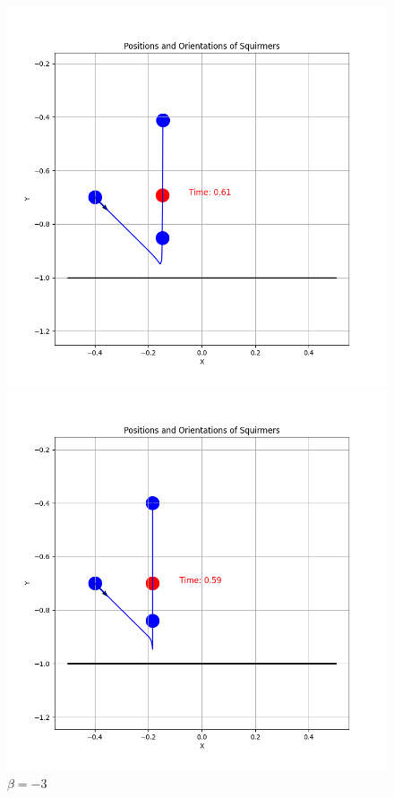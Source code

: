 \documentclass{article}
\begin{document}
\begin{figure}[H]
\begin{minipage}{0.49\textwidth}
        \caption{\footnotesize $\beta = 3$}
    \end{minipage}
    \begin{minipage}{0.49\textwidth}
        \includegraphics[width=1.1\textwidth]{graphs/simulations/border/betam1_5/mpi_4.png}
        \caption{\footnotesize $\beta = -1.5$}
    \end{minipage}\hfill
    \begin{minipage}{0.49\textwidth}
        \includegraphics[width=1.1\textwidth]{graphs/simulations/border/betam3/mpi_4.png}
        \caption{\footnotesize $\beta = -3$}
    \end{minipage}
\end{figure}
\end{document}
